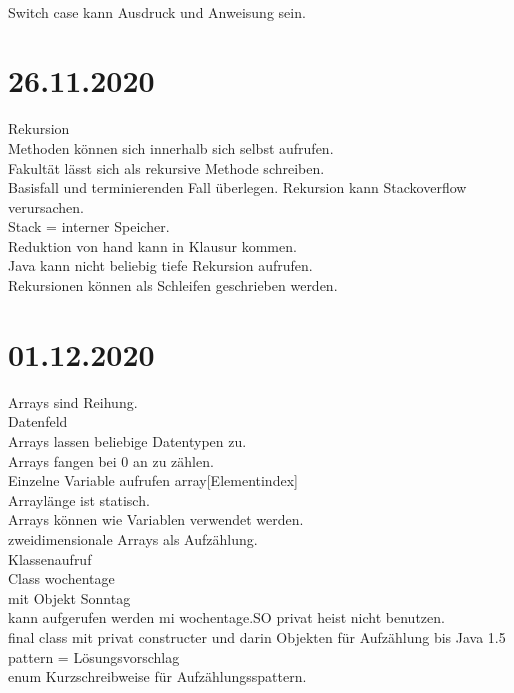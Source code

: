 \documentclass{article}
\begin{document}
	\paragraph*{}
	Switch case kann Ausdruck und Anweisung sein. \\
	
	\section*{26.11.2020}
	Rekursion \\
	Methoden können sich innerhalb sich selbst aufrufen. \\
	Fakultät lässt sich als rekursive Methode schreiben. \\
	Basisfall und terminierenden Fall überlegen.
	Rekursion kann Stackoverflow verursachen. \\
	Stack = interner Speicher. \\
	Reduktion von hand kann in Klausur kommen. \\
	Java kann nicht beliebig tiefe Rekursion aufrufen. \\
	Rekursionen können als Schleifen geschrieben werden.
	 	
	\section*{01.12.2020}
	Arrays sind Reihung. \\
	Datenfeld \\
	Arrays lassen beliebige Datentypen zu. \\
	Arrays fangen bei 0 an zu zählen. \\
	Einzelne Variable aufrufen array[Elementindex] \\
	Arraylänge ist statisch. \\
	Arrays können wie Variablen verwendet werden. \\
	zweidimensionale Arrays als Aufzählung. \\
	Klassenaufruf \\
	Class wochentage \\
	mit Objekt Sonntag \\
	kann aufgerufen werden mi wochentage.SO
	privat heist nicht benutzen. \\
	final class mit privat constructer und darin Objekten für Aufzählung bis Java 1.5 \\
	pattern =  Lösungsvorschlag	\\
	enum Kurzschreibweise für Aufzählungsspattern. \\
	
\end{document}
